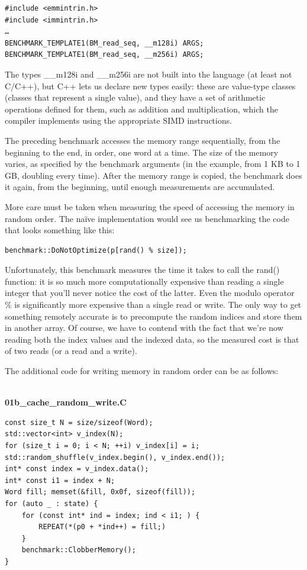 \begin{lstlisting}[style=styleCXX]
#include <emmintrin.h>
#include <immintrin.h>
…
BENCHMARK_TEMPLATE1(BM_read_seq, __m128i) ARGS;
BENCHMARK_TEMPLATE1(BM_read_seq, __m256i) ARGS;
\end{lstlisting}

The types \_\_m128i and \_\_m256i are not built into the language (at least not C/C++), but C++ lets us declare new types easily: these are value-type classes (classes that represent a single value), and they have a set of arithmetic operations defined for them, such as addition and multiplication, which the compiler implements using the appropriate SIMD instructions.

The preceding benchmark accesses the memory range sequentially, from the beginning to the end, in order, one word at a time. The size of the memory varies, as specified by the benchmark arguments (in the example, from 1 KB to 1 GB, doubling every time). After the memory range is copied, the benchmark does it again, from the beginning, until enough measurements are accumulated.

More care must be taken when measuring the speed of accessing the memory in random order. The naïve implementation would see us benchmarking the code that looks something like this:

\begin{lstlisting}[style=styleCXX]
benchmark::DoNotOptimize(p[rand() % size]);
\end{lstlisting}

Unfortunately, this benchmark measures the time it takes to call the rand() function: it is so much more computationally expensive than reading a single integer that you'll never notice the cost of the latter. Even the modulo operator \% is significantly more expensive than a single read or write. The only way to get something remotely accurate is to precompute the random indices and store them in another array. Of course, we have to contend with the fact that we're now reading both the index values and the indexed data, so the measured cost is that of two reads (or a read and a write).

The additional code for writing memory in random order can be as follows:

\hspace*{\fill} \\ %
\noindent
\textbf{01b\_cache\_random\_write.C}
\begin{lstlisting}[style=styleCXX]
const size_t N = size/sizeof(Word);
std::vector<int> v_index(N);
for (size_t i = 0; i < N; ++i) v_index[i] = i;
std::random_shuffle(v_index.begin(), v_index.end());
int* const index = v_index.data();
int* const i1 = index + N;
Word fill; memset(&fill, 0x0f, sizeof(fill));
for (auto _ : state) {
	for (const int* ind = index; ind < i1; ) {
		REPEAT(*(p0 + *ind++) = fill;)
	}
	benchmark::ClobberMemory();
}
\end{lstlisting}

